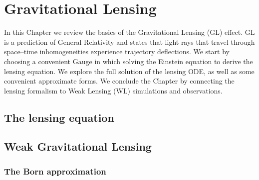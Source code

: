 
\chapter{Gravitational Lensing}
\lhead[\fancyplain{}{\thepage}]{\fancyplain{}{\rightmark}}
 \thispagestyle{plain}
\setlength{\parindent}{10mm}


In this Chapter we review the basics of the Gravitational Lensing (GL) effect. GL is a prediction of General Relativity and states that light rays that travel through space--time inhomogeneities experience trajectory deflections. We start by choosing a convenient Gauge in which solving the Einstein equation to derive the lensing equation. We explore the full solution of the lensing ODE, as well as some convenient approximate forms. We conclude the Chapter by connecting the lensing formalism to Weak Lensing (WL) simulations and observations. 

\section{The lensing equation}

\section{Weak Gravitational Lensing}

\subsection{The Born approximation}   

%